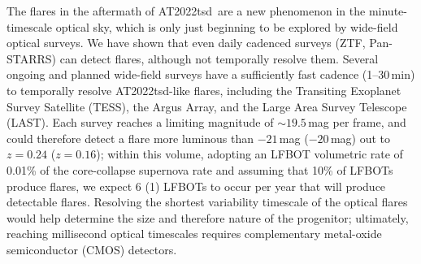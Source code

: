 \documentclass{nature_plusfigure}
\newcommand{\at}{AT2022tsd}
\begin{document}
The flares in the aftermath of \at\ are a new phenomenon in the minute-timescale optical sky, which is only just beginning to be explored by wide-field optical surveys\cite{Andreoni2020,Richmond2020,Corbett2023,Ofek2023}.
We have shown that even daily cadenced surveys (ZTF, Pan-STARRS) can detect flares, although not temporally resolve them. Several ongoing and planned wide-field surveys have a sufficiently fast cadence (1--30\,min) to temporally resolve \at-like flares, including the Transiting Exoplanet Survey Satellite (TESS\cite{Ricker2015}), the Argus Array\cite{Law2022}, and the Large Area Survey Telescope (LAST\cite{Ofek2023}). Each survey reaches a limiting magnitude of $\sim19.5$\,mag per frame, and could therefore detect a flare more luminous than $-21$\,mag ($-20$\,mag) out to $z=0.24$ ($z=0.16$);
within this volume, adopting an LFBOT volumetric rate of 0.01\% of the core-collapse supernova rate\cite{Ho2022_RET} and assuming that 10\% of LFBOTs produce flares, we expect 6 (1) LFBOTs to occur per year that will produce detectable flares.
Resolving the shortest variability timescale of the optical flares would help determine the size and therefore nature of the progenitor; ultimately, reaching millisecond optical timescales requires complementary metal-oxide semiconductor (CMOS) detectors.


\newpage
\end{document}
